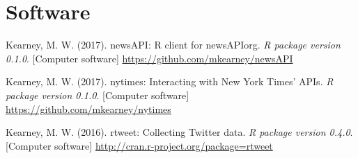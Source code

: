 \section{Software}
\begin{bibenum}
\item Kearney, M. W. (2017). newsAPI: R client for newsAPIorg.
\textit{R package version 0.1.0}. [Computer software]
\href{https://github.com/mkearney/newsAPI}{https://github.com/mkearney/newsAPI}

\item Kearney, M. W. (2017). nytimes: Interacting with New York Times' APIs.
\textit{R package version 0.1.0}. [Computer software]
\href{https://github.com/mkearney/nytimes}{https://github.com/mkearney/nytimes}

\item Kearney, M. W. (2016). rtweet: Collecting Twitter data.
\textit{R package version 0.4.0}. [Computer software]
\href{http://cran.r-project.org/package=rtweet}{http://cran.r-project.org/package=rtweet}
\end{bibenum}
